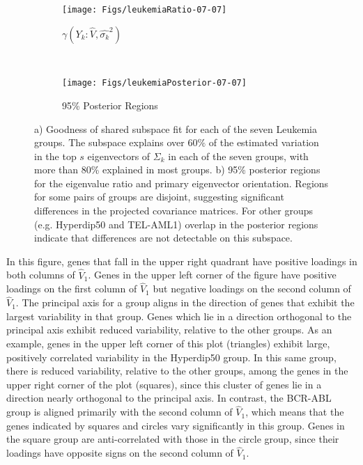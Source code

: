 \documentclass[12pt]{article}
\begin{document}
\begin{figure}[t]
    \centering
    \begin{subfigure}[b]{0.45\textwidth}
        \texttt{[image: Figs/leukemiaRatio-07-07]}
        \caption{$\gamma(Y_k: \hat{V}, \hat{\sigma_k}^2)$}
        \label{fig:leukemiaRatio}
    \end{subfigure}
    ~ %
    \begin{subfigure}[b]{0.45\textwidth}
        \texttt{[image: Figs/leukemiaPosterior-07-07]}
        \caption{95\% Posterior Regions }
        \label{fig:leukemiaPosterior}
      \end{subfigure}
      \caption{a) Goodness of shared subspace fit for each of the
        seven Leukemia groups.  The subspace explains over $60\%$ of
        the estimated variation in the top $s$ eigenvectors of
        $\Sigma_k$ in each of the seven groups, with more than 80\%
        explained in most groups.  b) 95\% posterior regions for the
        eigenvalue ratio and primary eigenvector orientation.  Regions
        for some pairs of groups are disjoint, suggesting significant
        differences in the projected covariance matrices.  For other
        groups (e.g. Hyperdip50 and TEL-AML1) overlap in the posterior
        regions indicate that differences are not detectable on this
        subspace. }
\label{fig:leukemia}
\end{figure}

In this figure, genes that fall in the upper right quadrant have
positive loadings in both columns of $\hat{V}_1$. Genes in the upper left
corner of the figure have positive loadings on the first column of $\hat{V}_1$
but negative loadings on the second column of $\hat{V}_1$.  The principal axis
for a group aligns in the direction of genes that exhibit the largest
variability in that group.  Genes which lie in a direction orthogonal
to the principal axis exhibit reduced variability, relative to the
other groups. As an example, genes in the upper left corner of this
plot (triangles) exhibit large, positively correlated variability in
the Hyperdip50 group.  In this same group, there is reduced
variability, relative to the other groups, among the genes in the
upper right corner of the plot (squares), since this cluster of genes lie in
a direction nearly orthogonal to the principal axis.  In contrast, the
BCR-ABL group is aligned primarily with the second column of $\hat{V}_1$,
which means that the genes indicated by squares and circles vary
significantly in this group.  Genes in the square group are
anti-correlated with those in the circle group, since their
loadings have opposite signs on the second column of $\hat{V}_1$.
\end{document}
